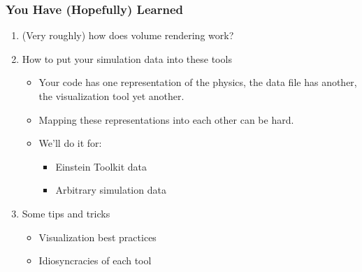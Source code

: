 \documentclass[]{beamer}
\begin{document}
\begin{frame}
  \frametitle{You Have (Hopefully) Learned}
  \begin{enumerate}
  \item (Very roughly) how does volume rendering work?
  \item How to put your simulation data into these tools
    \begin{itemize}
    \item Your code has one representation of the physics, the data
      file has another, the visualization tool yet another.
    \item Mapping these representations into each other can be hard.
    \item We'll do it for:
      \begin{itemize}
      \item  Einstein Toolkit data
      \item  Arbitrary simulation data
      \end{itemize}
    \end{itemize}
  \item Some tips and tricks
    \begin{itemize}
    \item Visualization best practices
    \item Idiosyncracies of each tool
    \end{itemize}
  \end{enumerate}
\end{frame}
\end{document}
